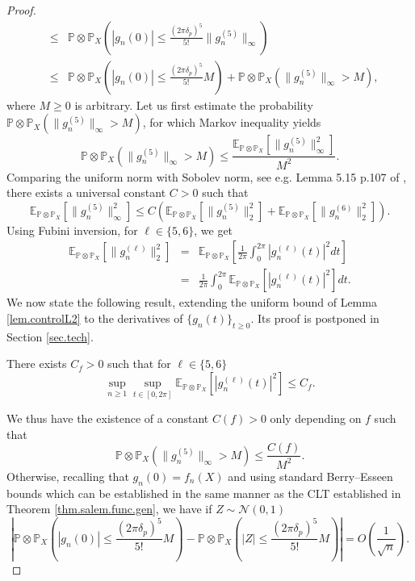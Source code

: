 \documentclass{svproc}
\newcommand{\Prob}{\mathbb{P}}
\newcommand \Esp {\mathbb{E}}
\begin{document}
\begin{proof}
\begin{eqnarray*}
&\leq& \Prob\otimes \Prob_X\left(|g_n(0)| \leq \frac{(2\pi \delta_p)^{5}}{5!}\|g_n^{(5)}\|_{\infty}\right) \\
&\leq& \Prob \otimes \Prob_X\left(|g_n(0)|\leq \frac{(2\pi \delta_p)^{5}}{5!}M\right) + \Prob \otimes \Prob_X\left(\|g_{n}^{(5)}\|_{\infty} >M\right),
 \end{eqnarray*}
where $M\geq 0$ is arbitrary.  
Let us first estimate the probability $\displaystyle \Prob \otimes \Prob_X\left(\|g_n^{(5)}\|_{\infty}>M\right)$,
for which Markov inequality yields
\[
\Prob \otimes \Prob_X\left(\|g_n^{(5)}\|_{\infty}>M\right) \leq \frac{\Esp_{\Prob \otimes \Prob_X}\left[ \|g_n^{(5)}\|_{\infty}^2\right]}{M^2}.
\]
Comparing the uniform norm with Sobolev norm, see e.g. Lemma 5.15 p.107 of \cite{Ada03}, there exists a universal constant $C>0$ such that
\[
\Esp_{\Prob \otimes \Prob_X}\left[\|g_n^{(5)}\|_{\infty}^2\right]\leq C \left( \Esp_{\Prob \otimes \Prob_X}\left[\|g_n^{(5)}\|^2_{2}\right]+\Esp_{\Prob\otimes \Prob_X}\left[\|g_n^{(6)}\|^2_2\right] \right).
\]
Using Fubini inversion, for $\ell \in \{5,6\}$, we get
\begin{eqnarray*}
\Esp_{\Prob\otimes \Prob_X}\left[\|g_n^{(\ell)}\|^2_2\right]&=&\Esp_{\Prob\otimes \Prob_X}\left[\frac{1}{2\pi}\int_0^{2\pi}|g_n^{(\ell)}(t)|^2dt\right]\\
&=&\frac{1}{2\pi}\int_0^{2\pi}\Esp_{\Prob\otimes \Prob_X}\left[|g_n^{(\ell)}(t)|^2\right]dt.
\end{eqnarray*}
We now state the following result, extending the uniform bound of Lemma \ref{lem.controlL2} to the derivatives of $\{g_n(t)\}_{t\ge 0}$. Its proof is postponed in Section \ref{sec.tech}.
\begin{lemma} \label{lm.est.bir.gen}
There exists $C_f>0$ such that for $\ell \in \{5,6\}$
$$\sup_{n\ge 1}\sup_{t\in [0,2\pi]}\Esp_{\Prob\otimes \Prob_X}\left[|g_n^{(\ell)}(t)|^2\right]\leq C_f.$$
\end{lemma}
\noindent
We thus have the existence of a constant $C(f)>0$ only depending on $f$ such that
\begin{equation}\label{eq.probgn}\Prob\otimes \Prob_X(\|g_n^{(5)}\|_{\infty}>M)\leq \frac{C(f)}{M^2}.\end{equation}
Otherwise, recalling that $g_n(0)=f_n(X)$ and using standard Berry--Esseen bounds which can be established in the same manner as the CLT established in Theorem \ref{thm.salem.func.gen}, we have if $Z \sim \mathcal N(0,1)$
\[
\left| \Prob \otimes \Prob_X\left(|g_n(0)|\leq \frac{(2\pi \delta_p)^{5}}{5!}M\right) - \Prob \otimes \Prob_X\left(|Z|\leq \frac{(2\pi \delta_p)^{5}}{5!}M\right) \right| = O\left(  \frac{1}{\sqrt{n}} \right) .
\]
\end{proof}
\end{document}
